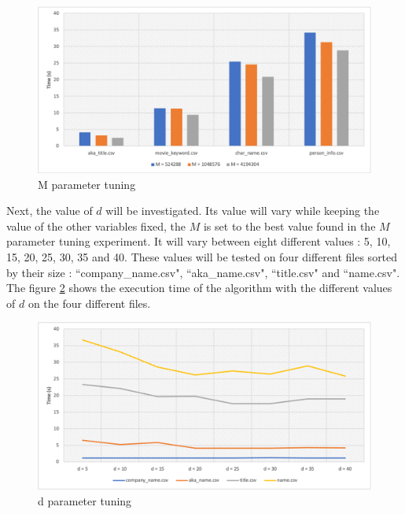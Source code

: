 \documentclass[12pt]{article}
\begin{document}
\begin{figure}[H] 
\begin{adjustwidth}{-3cm}{-1cm}
 \begin{center}
\includegraphics[width=20cm]{images/extsort1.png}
\end{center}
\caption{M parameter tuning}
\label{fig:7}
\end{adjustwidth}
\end{figure}

Next, the value of $d$ will be investigated. Its value will vary while keeping the value of the other variables fixed, the $M$ is set to the best value found in the $M$ parameter tuning experiment. It will vary between eight different values : 5, 10, 15, 20, 25, 30, 35 and 40. These values will be tested on four different files sorted by their size : ``company\_name.csv", ``aka\_name.csv", ``title.csv" and ``name.csv". The figure \ref{fig:8} shows the execution time of the algorithm with the different values of $d$ on the four different files.

\begin{figure}[H] 
\begin{adjustwidth}{-3cm}{-1cm}
 \begin{center}
\includegraphics[width=20cm]{images/extsort2.png}
\end{center}
\caption{d parameter tuning}
\label{fig:8}
\end{adjustwidth}
\end{figure}
\end{document}

